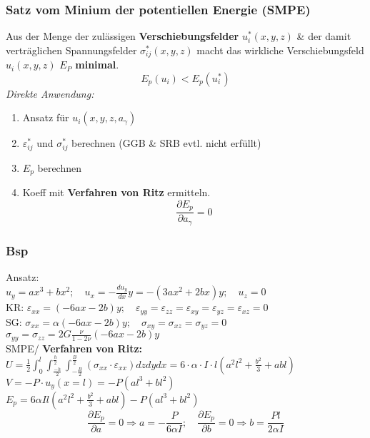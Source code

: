         \subsubsection{Satz vom Minium der potentiellen Energie (SMPE)}
            Aus der Menge der zulässigen \textbf{Verschiebungsfelder} $u_i^*(x,y,z)$ \& der damit verträglichen Spannungsfelder $\sigma_{ij}^*(x,y,z)$ macht das wirkliche Verschiebungsfeld $u_i(x,y,z)$ $E_P$ \textbf{minimal}.
            \[E_p(u_i) < E_p(u_i^*)\]
            \textit{Direkte Anwendung:}
            \begin{enumerate}
                \item Ansatz für $u_i(x,y,z,a_{\gamma})$
                \item $\varepsilon_{ij}^*$ und $\sigma_{ij}^*$ berechnen (GGB \& SRB evtl. nicht erfüllt)
                \item $E_p$ berechnen
                \item Koeff mit \textbf{Verfahren von Ritz} ermitteln.
                \[\frac{\partial E_p}{\partial a_{\gamma}} =0\]
            \end{enumerate}
            
        \subsubsection{Bsp}
            Ansatz:\\
            $u_y=ax^3+bx^2; \quad u_x=-\frac{du_y}{dx}y= -(3ax^2+2bx)y; \quad u_z = 0$\\
            KR: $\varepsilon_{xx} =(-6ax-2b)y; \quad \varepsilon_{yy}=\varepsilon_{zz}=\varepsilon_{xy}=\varepsilon_{yz} = \varepsilon_{xz}=0$\\
            SG: $\sigma_{xx} = \alpha(-6ax-2b)y; \quad \sigma_{xy}=\sigma_{xz}=\sigma_{yz}=0$\\ $\sigma_{yy}=\sigma_{zz}=2G\frac{\nu}{1-2\nu}(-6ax-2b)y$\\
            SMPE/ \textbf{Verfahren von Ritz:}\\
            $U=\frac{1}{2}\int_0^l\int_\frac{-h}{2}^\frac{h}{2}\int_{-\frac{B}{2}}^\frac{B}{2}(\sigma_{xx}\cdot\varepsilon_{xx})dzdydx=6\cdot\alpha\cdot I\cdot l(a^2l^2+\frac{b^2}{3}+abl)$\\
            $V=-P\cdot u_y(x=l)=-P(al^3+bl^2)$\\
            $E_p=6\alpha Il(a^2l^2+\frac{b^2}{3}+abl)-P(al^3+bl^2)$
            \small\[\frac{\partial E_p}{\partial a} = 0 \Rightarrow a=-\frac{P}{6\alpha I};\quad\frac{\partial E_p}{\partial b} = 0 \Rightarrow b=\frac{Pl}{2\alpha I}\]\normalsize
        \vspace{-3mm}    
        
